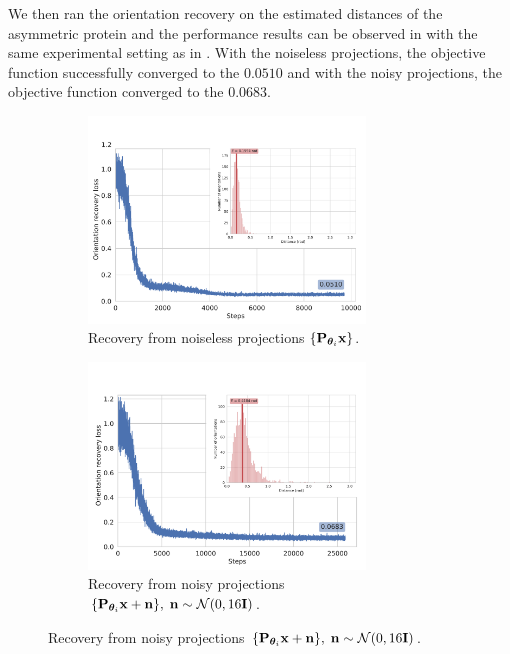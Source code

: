 We then ran the orientation recovery on the estimated distances of the asymmetric protein and the performance results can be observed in  with the same experimental setting as in .
With the noiseless projections, the objective function successfully converged to the $0.0510$ and with the noisy projections, the objective function converged to the $0.0683$.

\begin{figure}[ht!]
    \centering
    \begin{subfigure}[b]{0.45\linewidth}
        \includegraphics[height=5.5cm]{figures/5j0n_noise0_ar_aa}
        \caption{Recovery from noiseless projections $\{ \mathbf{P}_{{\boldsymbol{\theta}}_i} \mathbf{x} \}$.}
    \end{subfigure}
    \hfill
    \begin{subfigure}[b]{0.51\linewidth}
    \centering
        \includegraphics[height=5.5cm]{figures/5j0n_noise16_ar_aa}
        \caption{Recovery from noisy projections $\{ \mathbf{P}_{{\boldsymbol{\theta}}_i} \mathbf{x} + \mathbf{n} \}, \; \mathbf{n} \sim \mathcal{N}(0, 16\mathbf{I})$.}
    \end{subfigure}

\end{figure}
